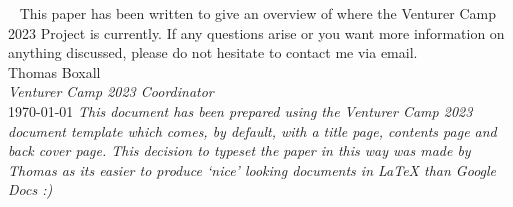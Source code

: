 \documentclass[a4paper, 11pt]{report}
\begin{document}
    \begin{titlepage}
    
    \end{titlepage}
    \ \vfill
    This paper has been written to give an overview of where the Venturer Camp 2023 Project is currently. If any questions arise or you want more information on anything discussed, please do not hesitate to contact me via email.\\[1em]
    Thomas Boxall\\
    \textit{Venturer Camp 2023 Coordinator}\\[1em]
    \today
    \vfill
    \textit{\small This document has been prepared using the Venturer Camp 2023 document template which comes, by default, with a title page, contents page and back cover page. This decision to typeset the paper in this way was made by Thomas as its easier to produce `nice' looking documents in \LaTeX{} than Google Docs :)}
    \vspace{2em}

    \tableofcontents
    
    
    
    
    

    \backPage
\end{document}
